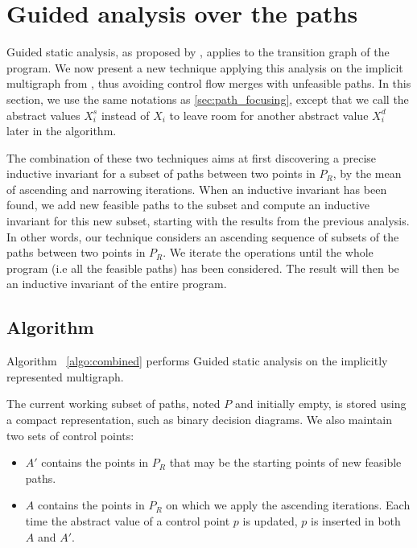\documentclass[preprint]{sigplanconf}
\begin{document}
\section{Guided analysis over the paths}
\label{sec:guided_multigraph}

Guided static analysis, as proposed by \citet{DBLP:conf/sas/GopanR07}, applies to the transition
graph of the program. We now present a new technique applying this analysis on the implicit
multigraph from \cite{Monniaux_Gonnord_SAS11}, thus avoiding control flow merges with
unfeasible paths.
In this section, we use the same notations as \ref{sec:path_focusing}, except
that we call the abstract values $X_i^s$ instead of $X_i$ to leave room for
another abstract value $X_i^d$ later in the algorithm.

The combination of these two techniques aims at first discovering a precise
inductive invariant for a subset of paths between two points in $P_R$, 
by the mean of ascending and narrowing iterations. When an
inductive invariant has been found, we add new feasible paths to the subset and
compute an inductive invariant for this new subset, starting with the results
from the previous analysis.
In other words, our technique considers an ascending sequence of
subsets of the paths between two points in $P_R$.
We iterate the operations until the whole program (i.e all the
feasible paths) has been considered. The result will then be an
inductive invariant of the entire program.

\subsection{Algorithm}


Algorithm~ \ref{algo:combined} performs Guided static analysis on the implicitly represented multigraph.

The current working subset of paths, noted $P$ and initially empty, is
stored using a compact representation, such as binary decision
diagrams. We also maintain two sets of control points:
\begin{itemize}
	\item $A'$ contains the points in $P_R$ that may be the starting points of new
		feasible paths.
	\item $A$ contains the points in $P_R$ on which we apply the ascending iterations.
	Each time the abstract value of a control point $p$ is updated, $p$ is
	inserted in both $A$ and $A'$.
\end{itemize}
\end{document}
